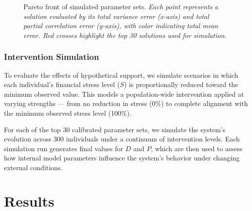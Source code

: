 \documentclass[
]{article}
\begin{document}
\begin{figure}


\caption{\label{fig-pareto}Pareto front of simulated parameter sets.
\emph{Each point represents a solution evaluated by its total variance
error (x-axis) and total partial correlation error (y-axis), with color
indicating total mean error. Red crosses highlight the top 30 solutions
used for simulation.}}

\end{figure}%

\subsubsection{Intervention Simulation}\label{intervention-simulation}

To evaluate the effects of hypothetical support, we simulate scenarios
in which each individual's financial stress level (\(S\)) is
proportionally reduced toward the minimum observed value. This models a
population-wide intervention applied at varying strengths --- from no
reduction in stress (0\%) to complete alignment with the minimum
observed stress level (100\%).

For each of the top 30 calibrated parameter sets, we simulate the
system's evolution across 300 individuals under a continuum of
intervention levels. Each simulation run generates final values for
\(D\) and \(P\), which are then used to assess how internal model
parameters influence the system's behavior under changing external
conditions.

\section{Results}\label{results}
\end{document}
